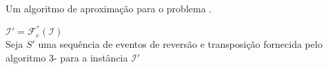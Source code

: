 \begin{algorithm}[!tbh]
  \caption{Um algoritmo de aproximação para o problema \SbFIRT{}.\label{algorithm:EMLPACHB}}
  $\mathcal{I}' = \mathcal{F}_{c}^{''}(\mathcal{I})$ \\
  Seja $S'$ uma sequência de eventos de reversão e transposição fornecida pelo algoritmo $3$-\SbIRT{} para a instância $\mathcal{I}'$ \\
\end{algorithm}